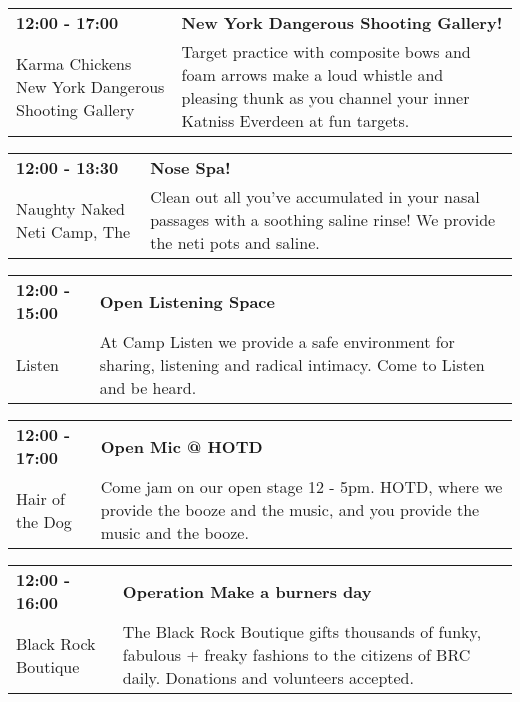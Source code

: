 \begin{tabular}{ p{1in} p{2.2in} }
    \textbf{12:00 - 17:00} & \textbf{New York Dangerous Shooting Gallery!} \\
    Karma Chickens \newline New York Dangerous Shooting Gallery & Target practice with composite bows and foam arrows make a loud whistle and pleasing thunk as you channel your inner Katniss Everdeen at fun targets. \\
    \hline 
\end{tabular}
    
\begin{tabular}{ p{1in} p{2.2in} }
    \textbf{12:00 - 13:30} & \textbf{Nose Spa! } \\
    Naughty Naked Neti Camp, The \newline  & Clean out all you've accumulated in your nasal passages with a soothing saline rinse! We provide the neti pots and saline. \\
    \hline 
\end{tabular}
    
\begin{tabular}{ p{1in} p{2.2in} }
    \textbf{12:00 - 15:00} & \textbf{Open Listening Space} \\
    Listen \newline  & At Camp Listen we provide a safe environment for sharing, listening and radical intimacy. Come to Listen and be heard. \\
    \hline 
\end{tabular}
    
\begin{tabular}{ p{1in} p{2.2in} }
    \textbf{12:00 - 17:00} & \textbf{Open Mic @ HOTD} \\
    Hair of the Dog \newline  & Come jam on our open stage 12 - 5pm. HOTD, where we provide the booze and the music, and you provide the music and the booze. \\
    \hline 
\end{tabular}
    
\begin{tabular}{ p{1in} p{2.2in} }
    \textbf{12:00 - 16:00} & \textbf{Operation Make a burners day} \\
    Black Rock Boutique \newline  & The Black Rock Boutique gifts thousands of funky, fabulous + freaky fashions to the citizens of BRC daily.  Donations and volunteers accepted. \\
    \hline 
\end{tabular}
    
